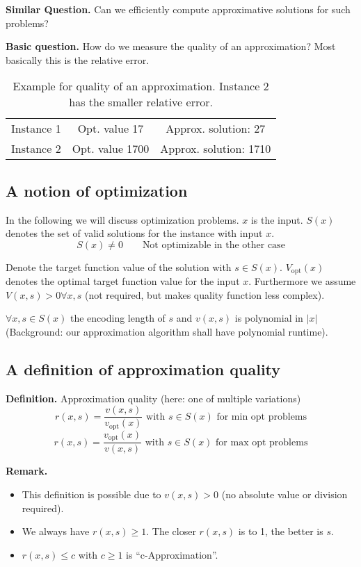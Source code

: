\documentclass[a4paper]{article}
\newcommand{\card}[1]{|#1|}
\begin{document}
\textbf{Similar Question.}
  Can we efficiently compute approximative solutions for such problems?

\textbf{Basic question.}
  How do we measure the quality of an approximation?
  Most basically this is the relative error.

\begin{table}[ht]
 \begin{center}
  \begin{tabular}{ccc}
    Instance 1 & Opt. value 17 & Approx. solution: 27 \\
    Instance 2 & Opt. value 1700 & Approx. solution: 1710
  \end{tabular}
  \caption{
    Example for quality of an approximation.
    Instance 2 has the smaller relative error.
  }
 \end{center}
\end{table}

\subsection{A notion of optimization}

In the following we will discuss optimization problems. $x$ is the input. $S(x)$ denotes the set of valid solutions for the instance with input $x$.
\[
  S(x) \neq 0 \qquad \text{Not optimizable in the other case}
\]

Denote the target function value of the solution with $s \in S(x)$.
$V_{\text{opt}}(x)$ denotes the optimal target function value for
the input $x$.
Furthermore we assume $V(x, s) > 0 \forall x, s$
(not required, but makes quality function less complex).

$\forall x, s \in S(x)$ the encoding length of $s$ and $v(x, s)$
is polynomial in $\card{x}$ (Background: our approximation algorithm
shall have polynomial runtime).

\subsection{A definition of approximation quality}

\textbf{Definition.}
  Approximation quality (here: one of multiple variations)
\[
  r(x, s) = \frac{v(x, s)}{v_{\text{opt}}(x)} \text{ with } s \in S(x)
  \text{ for min opt problems}
\] \[
  r(x, s) = \frac{v_{\text{opt}}(x)}{v(x, s)} \text{ with } s \in S(x)
  \text{ for max opt problems}
\]

\textbf{Remark.}
\begin{itemize}
  \item This definition is possible due to $v(x, s) > 0$
        (no absolute value or division required).
  \item We always have $r(x, s) \geq 1$.
        The closer $r(x, s)$ is to 1, the better is $s$.
  \item $r(x, s) \leq c$ with $c \geq 1$ is ``c-Approximation''.
\end{itemize}
\end{document}
